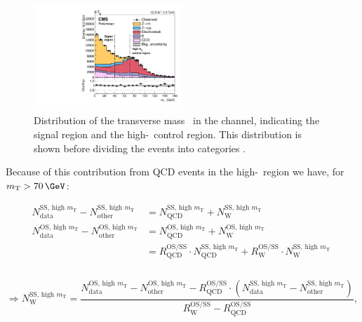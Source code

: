 \begin{figure}[h!]
\begin{center}
\includegraphics[width=0.5\textwidth]{./MSSM/Figures/CMS-PAS-HIG-16-037_Figure_002.pdf}
\end{center}
\caption{Distribution of the transverse mass \mT~in the \mutau channel, indicating
the signal region and the high-\mT~control region. This distribution is shown
before dividing the events into categories \cite{CMS-PAS-HIG-16-037}.}
\label{fig:mssm_bkgs_wjets_mutau_mt}
\end{figure}

Because of this contribution from QCD events in the high-\mT~region we
have, for $\mTm>70\,\GeV$:\\
\begin{minipage}{\textwidth}
\begin{equation*}
\begin{split}
N_{\text{data}}^{\text{SS, high } m_{\text{T}}} - N_{\text{other}}^{\text{SS,
 high } m_{\text{T}}} &=
N_{\text{QCD}}^{\text{SS, high } m_{\text{T}}} + N_{\text{W}}^{\text{SS, high } m_{\text{T}}}\\
N_{\text{data}}^{\text{OS, high } m_{\text{T}}} - N_{\text{other}}^{\text{OS,
 high } m_{\text{T}}}  &= N_{\text{QCD}}^{\text{OS, high } m_{\text{T}}} +
N_{\text{W}}^{\text{OS, high } m_{\text{T}}}\\
&= R_{\text{QCD}}^{\text{OS/SS}}\cdot N_{\text{QCD}}^{\text{SS, high } m_{\text{T}}} +
R_{\text{W}}^{\text{OS/SS}} \cdot N_{\text{W}}^{\text{SS, high } m_{\text{T}}} ~\\
\end{split}
\end{equation*}
~\vspace{-\baselineskip}
\begin{equation}\label{eqn:wjets_ss_norm}
\Rightarrow N_{\text{W}}^{\text{SS, high } m_{\text{T}}} = \frac{N_{\text{data}}^{\text{OS,
 high } m_{\text{T}}}  - N_{\text{other}}^{\text{OS, high } m_{\text{T}}}  -
R_{\text{QCD}}^{\text{OS/SS}}\cdot(N_{\text{data}}^{\text{SS, high } m_{\text{T}}}  -
N_{\text{other}}^{\text{SS, high } m_{\text{T}}} )}{R_{\text{W}}^{\text{OS/SS}} -
R_{\text{QCD}}^{\text{OS/SS}}},
\end{equation}
\end{minipage}

